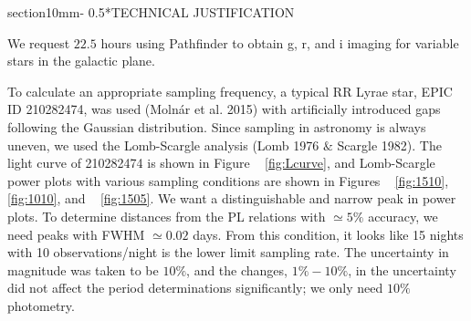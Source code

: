 \documentclass[letterpaper,11pt]{article}
\makeatletter
\renewcommand{\section}{\@startsection%
{section}{1}{0mm}{-\baselineskip}%
{0.5\baselineskip}{\normalfont\Large\bfseries}}%
\makeatother
\begin{document}
\clearpage
\section*{TECHNICAL JUSTIFICATION}


We request $22.5$ hours using Pathfinder to obtain g, r, and i imaging for variable stars in the galactic plane.

\vspace{3mm} %

\noindent To calculate an appropriate sampling frequency, a typical RR Lyrae star, EPIC ID 210282474, was used (Molnár et al. 2015) with artificially introduced gaps following the Gaussian distribution. Since sampling in astronomy is always uneven, we used the Lomb-Scargle analysis (Lomb 1976 $\&$ Scargle 1982). The light curve of 210282474 is shown in Figure ~ \ref{fig:Lcurve}, and Lomb-Scargle power plots with various sampling conditions are shown in Figures ~ \ref{fig:1510}, ~ \ref{fig:1010}, and ~ \ref{fig:1505}. We want a distinguishable and narrow peak in power plots. To determine distances from the PL relations with $\simeq5\%$ accuracy, we need peaks with FWHM $ \simeq 0.02$ days. From this condition, it looks like 15 nights with 10 observations/night is the lower limit sampling rate. The uncertainty in magnitude was taken to be $10\%$, and the changes, $1\% - 10\%$, in the uncertainty did not affect the period determinations significantly; we only need $10\%$ photometry.
\end{document}
